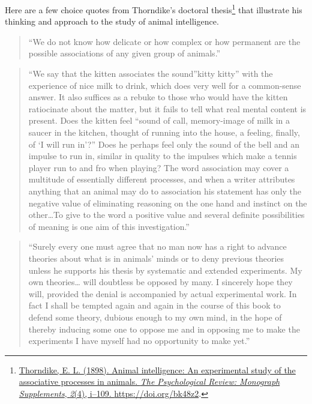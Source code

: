 \documentclass[
  oneside,
  12pt]{crumpbook}
\begin{document}
Here are a few choice quotes from Thorndike's doctoral thesis\footnote{\protect\hyperlink{ref-thorndikeAnimalIntelligenceExperimental1898}{Thorndike, E. L. (1898). Animal intelligence: {An} experimental study of the associative processes in animals. \emph{The Psychological Review: Monograph Supplements}, \emph{2}(4), i--109. \url{https://doi.org/bk48z2}}.} that illustrate his thinking and approach to the study of animal intelligence.

\begin{quote}
``We do not know how delicate or how complex or how permanent are the possible associations of any given group of animals.''
\end{quote}

\begin{quote}
``We say that the kitten associates the sound''kitty kitty'' with the experience of nice milk to drink, which does very well for a common-sense answer. It also suffices as a rebuke to those who would have the kitten ratiocinate about the matter, but it fails to tell what real mental content is present. Does the kitten feel ``sound of call, memory-image of milk in a saucer in the kitchen, thought of running into the house, a feeling, finally, of `I will run in'?'' Does he perhaps feel only the sound of the bell and an impulse to run in, similar in quality to the impulses which make a tennis player run to and fro when playing? The word association may cover a multitude of essentially different processes, and when a writer attributes anything that an animal may do to association his statement has only the negative value of eliminating reasoning on the one hand and instinct on the other\ldots To give to the word a positive value and several definite possibilities of meaning is one aim of this investigation.''
\end{quote}

\begin{quote}
``Surely every one must agree that no man now has a right to advance theories about what is in animals' minds or to deny previous theories unless he supports his thesis by systematic and extended experiments. My own theories\ldots{} will doubtless be opposed by many. I sincerely hope they will, provided the denial is accompanied by actual experimental work. In fact I shall be tempted again and again in the course of this book to defend some theory, dubious enough to my own mind, in the hope of thereby inducing some one to oppose me and in opposing me to make the experiments I have myself had no opportunity to make yet.''
\end{quote}
\end{document}
